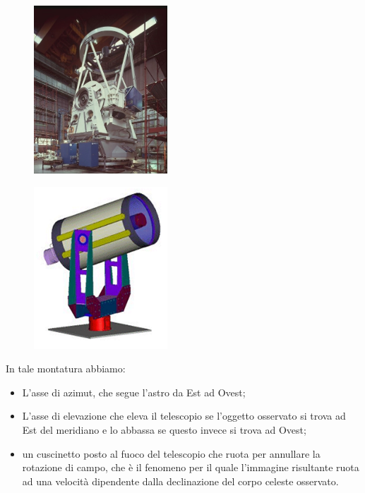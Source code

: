 \begin{minipage}{0.5\textwidth}
    \begin{figure}[H]
        \centering
        \includegraphics[width=5cm]{11.jpg}
\end{figure}
\end{minipage}
\begin{minipage}{0.5\textwidth}
    \begin{figure}[H]
        \centering
        \includegraphics[width=5cm]{immagini/montatura_altazimutale.png}
\end{figure}
\end{minipage}

\vspace{0.2cm}In tale montatura abbiamo:

\begin{itemize}
    \item L'asse di azimut, che segue l'astro da Est ad Ovest;
    \item L'asse di elevazione che eleva il telescopio se l'oggetto osservato si trova ad Est del meridiano e lo abbassa se questo invece si trova ad Ovest;
    \item un cuscinetto posto al fuoco del telescopio che ruota per annullare la rotazione di campo, che è il fenomeno per il quale l'immagine risultante ruota ad una velocità dipendente dalla declinazione del corpo celeste osservato.
\end{itemize}

